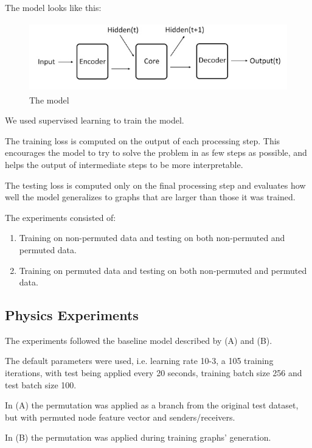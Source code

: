 The model looks like this:

\begin{figure}[!htb]
    \centering
    \includegraphics[height=3.0cm]{fig/content/model/model.jpg}
    \caption{The model}
\end{figure}

We used supervised learning to train the model. 

The training loss is computed on the output of each processing step. This encourages the model to try to solve the problem in as few steps as possible, and helps the output of intermediate steps to be more interpretable.

The testing loss is computed only on the final processing step and evaluates how well the model generalizes to graphs that are larger than those it was trained.

The experiments consisted of:

\begin{enumerate}[label=(\Alph*)]

    \item Training on non-permuted data and testing on both non-permuted  and permuted data.
    
    \item Training on permuted data and testing on both non-permuted and permuted data.

\end{enumerate}

\subsection{Physics Experiments}

The experiments followed the baseline model described by (A) and (B).

The default parameters were used, i.e. learning rate 10-3, a 105 training iterations, with test being applied every 20 seconds, training batch size 256 and test batch size 100.

In (A) the permutation was applied as a branch from the original test dataset, but with permuted node feature vector and senders/receivers.

In (B) the permutation was applied during training graphs’ generation.

